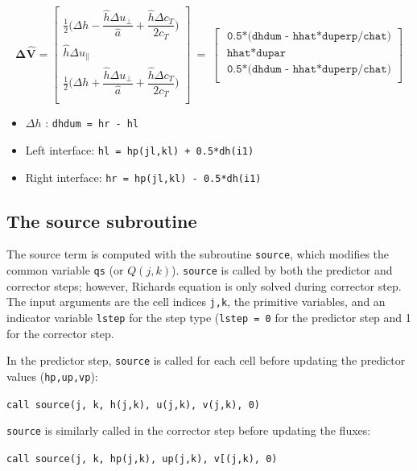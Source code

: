 \documentclass{article}
\newcommand{\code}[1]{\texttt{#1}}
\begin{document}
 \[ \mathbf{\Delta \hat{V}} = 
\begin{bmatrix}
	\frac{1}{2} \bigg( \Delta h - \dfrac{\hat h \Delta u_{\perp} }{\hat a} +
	 \dfrac{\hat h \Delta c_T }{2  c_T}\bigg) \\[.2cm]
      \hat h \Delta u_\parallel   \\[.2cm]
   	\frac{1}{2} \bigg( \Delta h + \dfrac{\hat h \Delta u_{\perp} }{\hat a} +
	 \dfrac{\hat h \Delta c_T }{2  c_T}\bigg) 
	 \\
\end{bmatrix} \ =  \ 
\begin{bmatrix}
 \code{ 0.5*(dhdum - hhat*duperp/chat)}  \\[.2cm]
 \code{ hhat*dupar}  \\[.2cm]
 \code{ 0.5*(dhdum - hhat*duperp/chat)}  \\
\end{bmatrix} 
\]

  \begin{itemize}
 	\item  $\Delta h$ : \code{dhdum = hr - hl } 
 	\item  Left interface:   \code{hl = hp(jl,kl) + 0.5*dh(i1)}
  	\item  Right interface:   \code{hr = hp(jl,kl) - 0.5*dh(i1)}
 \end{itemize}
 

\subsection{The source subroutine}

 The source term is computed with the subroutine \code{source}, which modifies the common variable \code{qs} (or $Q(j,k)$).
  \code{source} is called by both the predictor and corrector steps; however, Richards equation is only solved during corrector step. 
 The input arguments are the  cell indices \code{j,k}, the primitive variables, and an indicator variable \code{lstep} for the step type (\code{lstep = 0} for the predictor step and 1 for the corrector step.		
 
In the predictor step, \code{source} is called for each cell before updating the predictor values (\code{hp,up,vp}):
\begin{center}
\code{call source(j, k, h(j,k), u(j,k), v(j,k), 0)}
\end{center}

 
\code{source} is similarly  called in the corrector step before updating the fluxes: 
\begin{center}
\code{call source(j, k, hp(j,k), up(j,k), v[(j,k), 0)}
\end{center}
\end{document}
